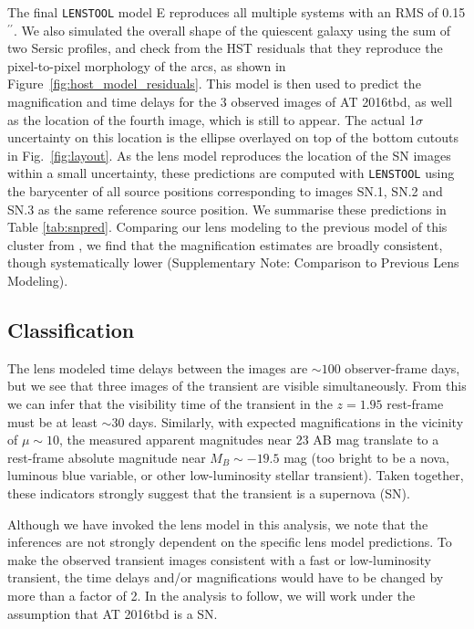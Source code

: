 \documentclass[12pt]{article}
\gdef\arcsec{$^{\prime\prime}$}
\def\SNABC{AT 2016tbd\xspace}
\def\lenstool{{\tt LENSTOOL}\xspace}
\begin{document}
The final \lenstool model E reproduces all multiple systems with an RMS of 0.15\arcsec. We also simulated the overall shape of the quiescent galaxy using the sum of two Sersic profiles, and check from the HST residuals that they reproduce the pixel-to-pixel morphology of the arcs, as shown in Figure~\ref{fig:host_model_residuals}. This model is then used to predict the magnification and time delays for the 3 observed images of \SNABC, as well as the location of the fourth  image, which is still to appear. The actual 1$\sigma$ uncertainty on this location is the ellipse overlayed on top of the bottom cutouts in Fig.~\ref{fig:layout}. As the lens model reproduces the location of the SN images within a small uncertainty, these predictions are computed with \lenstool using the barycenter of all source positions corresponding to images SN.1, SN.2 and SN.3 as the same reference source position. We summarise these predictions in Table \ref{tab:snpred}.
Comparing our lens modeling to the previous  model of this cluster from \cite{newman_resolving_2018}, we find that the magnification estimates are broadly consistent, though systematically lower (Supplementary Note: Comparison to Previous Lens Modeling).


\subsection*{Classification}

The lens modeled time delays between the images are $\sim100$ observer-frame days, 
but we see that three images of the transient are visible simultaneously.
From this we can infer that the visibility time of the transient in the $z=1.95$ rest-frame must be at least $\sim$30 days. 
Similarly, with expected magnifications in the vicinity of $\mu\sim10$, the measured apparent magnitudes near 23 AB mag translate to a rest-frame absolute magnitude near $M_B \sim-19.5$ mag (too bright to be a nova, luminous blue variable, or other low-luminosity stellar transient).
Taken together, these indicators strongly suggest that the transient is a supernova (SN). 

Although we have invoked the lens model in this analysis, we note that the inferences are not strongly dependent on the specific lens model predictions.  To make the observed transient images consistent with a fast or low-luminosity transient, the time delays and/or magnifications would have to be changed by more than a factor of 2.  In the analysis to follow, we will work under the assumption that \SNABC is a SN. 
\end{document}
